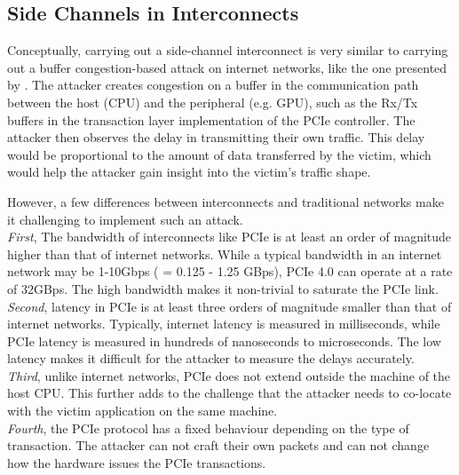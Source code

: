 \subsection{Side Channels in Interconnects}
\label{subsec:interconnect-sc-background-side-channels}

Conceptually, carrying out a side-channel interconnect is very similar to carrying out a buffer congestion-based attack on internet networks, like the one presented by \citet{schuster2017beautyburst}. 
The attacker creates congestion on a buffer in the communication path between the host (CPU) and the peripheral (e.g. GPU), such as the Rx/Tx buffers in the transaction layer implementation of the PCIe controller.
The attacker then observes the delay in transmitting their own traffic.
This delay would be proportional to the amount of data transferred by the victim, which would help the attacker gain insight into the victim's traffic shape.

However, a few differences between interconnects and traditional networks make it challenging to implement such an attack. \\
\textit{First}, The bandwidth of interconnects like PCIe is at least an order of magnitude higher than that of internet networks.
While a typical bandwidth in an internet network may be 1-10Gbps ( = 0.125 - 1.25 GBps), PCIe 4.0 can operate at a rate of 32GBps.
The high bandwidth makes it non-trivial to saturate the PCIe link. \\
\textit{Second}, latency in PCIe is at least three orders of magnitude smaller than that of internet networks.
Typically, internet latency is measured in milliseconds, while PCIe latency is measured in hundreds of nanoseconds to microseconds.
The low latency makes it difficult for the attacker to measure the delays accurately. \\
\textit{Third}, unlike internet networks, PCIe does not extend outside the machine of the host CPU.
This further adds to the challenge that the attacker needs to co-locate with the victim application on the same machine. \\
\textit{Fourth}, the PCIe protocol has a fixed behaviour depending on the type of transaction.
The attacker can not craft their own packets and can not change how the hardware issues the PCIe transactions.

\begin{comment}
https://www.linkedin.com/pulse/pci-express-primer-3-transaction-layer-simon-southwell/
\end{comment}